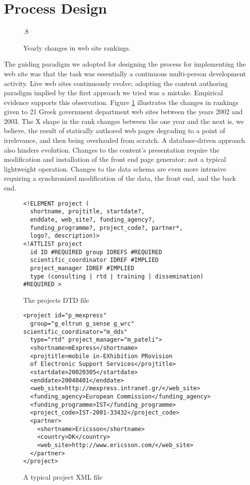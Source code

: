 \documentclass[10pt]{article}
\def\epsfsize#1#2{\ifdim#1>\columnwidth\columnwidth\else#1\fi}
\begin{document}
\section{Process Design}
\label{sec:design}
\begin{figure}
\begin{center}
\leavevmode
\def\epsfsize#1#2{\epsfxsize}
\epsfysize.8\vsize
{}
\end{center}
\caption{
\label{fig:rankyear}
Yearly changes in web site rankings.}
\end{figure}
The guiding paradigm we adopted for designing the process
for implementing the web site was that the task was essentially
a continuous multi-person development activity.
Live web sites continuously evolve;
adopting the content authoring paradigm implied
by the first approach we tried was a mistake.
Empirical evidence supports this observation.
Figure \ref{fig:rankyear} illustrates the changes
in rankings given to 21 Greek government department
web sites between the years 2002 and 2003.
The X shape in the rank changes between the one year and the next
is, we believe, the result of statically authored web pages
degrading to a point of irrelevance, and then being overhauled
from scratch.
A database-driven approach also hinders evolution.
Changes to the content's presentation require the modification
and installation of the front end page generator;
not a typical lightweight operation.
Changes to the data schema are even more intrusive
requiring a synchronized modification of the data,
the front end, and the back end.

\begin{figure}
\lstset{language=XML}
{\begin{lstlisting}
<!ELEMENT project (
  shortname, projtitle, startdate?, 
  enddate, web_site?, funding_agency?, 
  funding_programme?, project_code?, partner*,
  logo?, description)>
<!ATTLIST project
  id ID #REQUIRED group IDREFS #REQUIRED
  scientific_coordinator IDREF #IMPLIED
  project_manager IDREF #IMPLIED
  type (consulting | rtd | training | dissemination) #REQUIRED >
\end{lstlisting}}
\caption{The projects DTD file}
\label{fig:project-dtd}
\end{figure}

\begin{figure}
\lstset{language=PROJECTXML}
{\begin{lstlisting}
<project id="p_mexpress"
  group="g_eltrun g_sense g_wrc" scientific_coordinator="m_dds"
  type="rtd" project_manager="m_pateli">
  <shortname>mExpress</shortname>
  <projtitle>mobile in-EXhibition PRovision 
  of Electronic Support Services</projtitle>
  <startdate>20020305</startdate>
  <enddate>20040401</enddate>
  <web_site>http://mexpress.intranet.gr/</web_site>
  <funding_agency>European Commission</funding_agency>
  <funding_programme>IST</funding_programme>
  <project_code>IST-2001-33432</project_code>
  <partner>
    <shortname>Ericsson</shortname>
    <country>DK</country>
    <web_site>http://www.ericsson.com/</web_site>
  </partner>
</project>
\end{lstlisting}}
\caption{A typical project XML file}
\label{fig:project-xml}
\end{figure}
\end{document}
